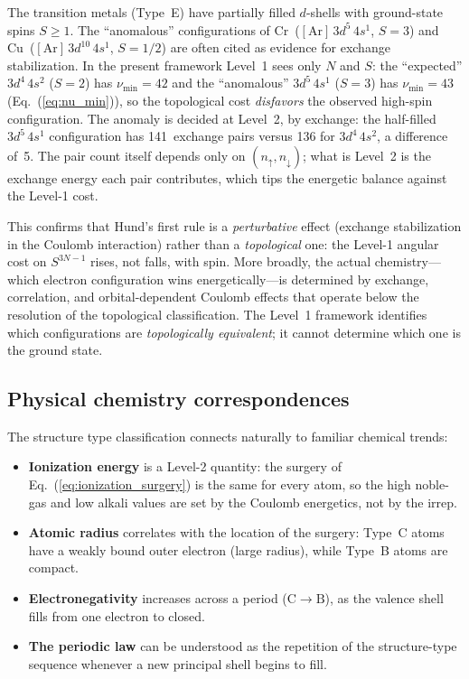 \documentclass[aps,prl,twocolumn,superscriptaddress,longbibliography]{revtex4-2}
\begin{document}
The transition metals (Type~E) have partially filled $d$-shells with
ground-state spins $S \geq 1$.  The ``anomalous'' configurations of
Cr~($[\mathrm{Ar}]\,3d^5\,4s^1$, $S = 3$) and
Cu~($[\mathrm{Ar}]\,3d^{10}\,4s^1$, $S = 1/2$) are often cited as
evidence for exchange stabilization.  In the present framework
Level~1 sees only $N$ and $S$: the ``expected'' $3d^4\,4s^2$ ($S = 2$)
has $\nu_{\min} = 42$ and the ``anomalous'' $3d^5\,4s^1$ ($S = 3$) has
$\nu_{\min} = 43$ (Eq.~(\ref{eq:nu_min})), so the topological cost
\emph{disfavors} the observed high-spin configuration.  The anomaly
is decided at Level~2, by exchange: the half-filled
$3d^5\,4s^1$ configuration has 141~exchange pairs versus 136 for
$3d^4\,4s^2$, a difference of~5.  The pair count itself depends only
on $(n_\uparrow, n_\downarrow)$; what is Level~2 is the exchange
energy each pair contributes, which tips the energetic balance
against the Level-1 cost.

This confirms that Hund's first rule is a \emph{perturbative} effect
(exchange stabilization in the Coulomb interaction) rather than a
\emph{topological} one: the Level-1 angular cost on $S^{3N-1}$ rises,
not falls, with spin.
More broadly, the actual chemistry---which electron configuration wins
energetically---is determined by exchange, correlation, and
orbital-dependent Coulomb effects that operate below the resolution of
the topological classification.  The Level~1 framework identifies
which configurations are \emph{topologically equivalent}; it cannot
determine which one is the ground state.

\subsection{Physical chemistry correspondences}

The structure type classification connects naturally to familiar
chemical trends:
\begin{itemize}
  \item \textbf{Ionization energy} is a Level-2 quantity: the surgery
    of Eq.~(\ref{eq:ionization_surgery}) is the same for every atom, so
    the high noble-gas and low alkali values are set by the Coulomb
    energetics, not by the irrep.
  \item \textbf{Atomic radius} correlates with the location of the
    surgery: Type~C atoms have a weakly bound outer electron (large
    radius), while Type~B atoms are compact.
  \item \textbf{Electronegativity} increases across a period
    ($\mathrm{C} \to \mathrm{B}$), as the valence shell fills from one
    electron to closed.
  \item \textbf{The periodic law} can be understood as the
    repetition of the structure-type sequence whenever a new principal
    shell begins to fill.
\end{itemize}
\end{document}
